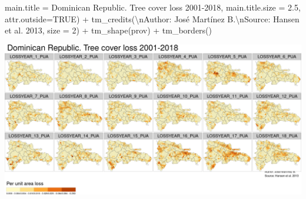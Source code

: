 \documentclass[10pt,landscape,a3paper]{article}
\newenvironment{Shaded}{\begin{snugshade}}{\end{snugshade}}
\newcommand{\AttributeTok}[1]{\textcolor[rgb]{0.77,0.63,0.00}{#1}}
\newcommand{\ConstantTok}[1]{\textcolor[rgb]{0.00,0.00,0.00}{#1}}
\newcommand{\DecValTok}[1]{\textcolor[rgb]{0.00,0.00,0.81}{#1}}
\newcommand{\FloatTok}[1]{\textcolor[rgb]{0.00,0.00,0.81}{#1}}
\newcommand{\FunctionTok}[1]{\textcolor[rgb]{0.00,0.00,0.00}{#1}}
\newcommand{\NormalTok}[1]{#1}
\newcommand{\SpecialCharTok}[1]{\textcolor[rgb]{0.00,0.00,0.00}{#1}}
\newcommand{\StringTok}[1]{\textcolor[rgb]{0.31,0.60,0.02}{#1}}
\begin{document}
\begin{Shaded}
\begin{Highlighting}[]
            \AttributeTok{main.title =} \StringTok{\textquotesingle{}Dominican Republic. Tree cover loss 2001{-}2018\textquotesingle{}}\NormalTok{,}
            \AttributeTok{main.title.size =} \FloatTok{2.5}\NormalTok{, }\AttributeTok{attr.outside=}\ConstantTok{TRUE}\NormalTok{) }\SpecialCharTok{+} 
  \FunctionTok{tm\_credits}\NormalTok{(}\StringTok{\textquotesingle{}}\SpecialCharTok{\textbackslash{}n}\StringTok{Author: José Martínez B.}\SpecialCharTok{\textbackslash{}n}\StringTok{Source: Hansen et al. 2013\textquotesingle{}}\NormalTok{, }\AttributeTok{size =} \DecValTok{2}\NormalTok{) }\SpecialCharTok{+}
  \FunctionTok{tm\_shape}\NormalTok{(prov) }\SpecialCharTok{+} \FunctionTok{tm\_borders}\NormalTok{()}
\end{Highlighting}
\end{Shaded}

\begin{center}\includegraphics{img/zonal-long-term-grid-6} \end{center}
\end{document}
